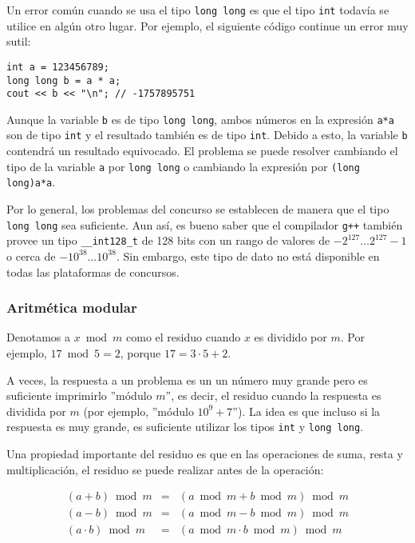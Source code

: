 Un error común cuando se usa el tipo \texttt{long long}
es que el tipo \texttt{int} todavía se utilice 
en algún otro lugar.
Por ejemplo, el siguiente código continue
un error muy sutil:

\begin{lstlisting}
int a = 123456789;
long long b = a * a;
cout << b << "\n"; // -1757895751
\end{lstlisting}

Aunque la variable \texttt{b} es de tipo \texttt{long long},
ambos números en la expresión \texttt{a*a}
son de tipo \texttt{int} y el resultado
también es de tipo \texttt{int}.
Debido a esto, la variable \texttt{b}
contendrá un resultado equivocado.
El problema se puede resolver cambiando el tipo
de la variable \texttt{a} por \texttt{long long} o
cambiando la expresión por \texttt{(long long)a*a}.

Por lo general, los problemas del concurso se establecen de manera que
el tipo \texttt{long long} sea suficiente.
Aun así, es bueno saber que
el compilador \texttt{g++} también provee
un tipo \texttt{\_\_int128\_t} de 128 bits
con un rango de valores de
$-2^{127} \ldots 2^{127}-1$ o cerca de $-10^{38} \ldots 10^{38}$.
Sin embargo, este tipo de dato no está disponible en todas las plataformas de concursos.

\subsubsection{Aritmética modular}


Denotamos a $x \bmod m$ como el residuo
cuando $x$ es dividido por $m$.
Por ejemplo, $17 \bmod 5 = 2$,
porque $17 = 3 \cdot 5 + 2$.

A veces, la respuesta a un problema es un
un número muy grande pero es suficiente
imprimirlo ''módulo $m$'', es decir,
el residuo cuando la respuesta es dividida por $m$
(por ejemplo, ''módulo $10^9+7$'').
La idea es que incluso si la respuesta
es muy grande,
es suficiente utilizar los tipos
\texttt{int} y \texttt{long long}.

Una propiedad importante del residuo es que
en las operaciones de suma, resta y multiplicación,
el residuo se puede realizar antes de la operación:

\[
\begin{array}{rcr}
(a+b) \bmod m & = & (a \bmod m + b \bmod m) \bmod m \\
(a-b) \bmod m & = & (a \bmod m - b \bmod m) \bmod m \\
(a \cdot b) \bmod m & = & (a \bmod m \cdot b \bmod m) \bmod m
\end{array}
\]

